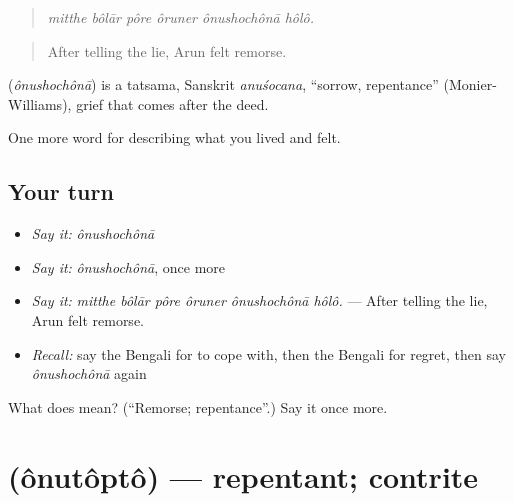 \begin{quote}
     
\end{quote}

\begin{quote}
\emph{mitthe bôlār pôre ôruner ônushochônā hôlô.}
\end{quote}

\begin{quote}
After telling the lie, Arun felt remorse.
\end{quote}

\begin{cousinweb}
\textbf{} (\emph{ônushochônā}) is a tatsama, Sanskrit \emph{anuśocana}, \textquotedblleft{}sorrow, repentance\textquotedblright{} (Monier-Williams), grief that comes after the deed.
\end{cousinweb}

\begin{grammarlens}[title={What you've built}]
One more word for describing what you lived and felt.
\end{grammarlens}

\subsection*{Your turn}
\begin{itemize}
\raggedright
  \item \emph{Say it:} \emph{ônushochônā}
  \item \emph{Say it:} \emph{ônushochônā}, once more
  \item \emph{Say it:} \emph{mitthe bôlār pôre ôruner ônushochônā hôlô.} — After telling the lie, Arun felt remorse.
  \item \emph{Recall:} say the Bengali for to cope with, then the Bengali for regret, then say \emph{ônushochônā} again
\end{itemize}

\begin{tcolorbox}[breakable,colback=teal!4,colframe=teal!35!black,title={Before you move on}]
What does  mean? (\textquotedblleft{}Remorse; repentance\textquotedblright{}.) Say it once more.
\end{tcolorbox}
\section[\texorpdfstring{\bn{অনুতপ্ত} (ônutôptô)}{অনুতপ্ত (ônutôptô)}]{ (ônutôptô) — repentant; contrite}


